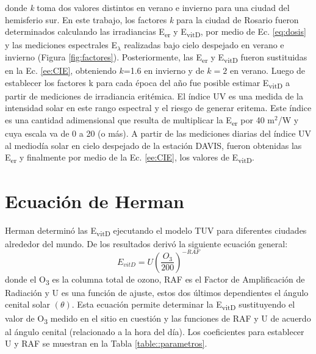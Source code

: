 \documentclass[10pt,twocolumn]{article}
\begin{document}
donde \emph{k} toma dos valores distintos en verano e invierno para una ciudad del hemisferio sur. En este trabajo, los factores \emph{k} para la ciudad de Rosario fueron determinados calculando las irradiancias E\textsubscript{er} y E\textsubscript{vitD}, por medio de Ec. \ref{eq:dosis} y las mediciones espectrales E$_\lambda$ realizadas bajo cielo despejado en verano e invierno (Figura \ref{fig:factores}). Posteriormente, las E\textsubscript{er} y E\textsubscript{vitD} fueron sustituidas en la Ec. \ref{ee:CIE}, obteniendo $k$=1.6 en invierno y de $k=2$ en verano. Luego de establecer los factores k para cada época del año fue posible estimar E\textsubscript{vitD} a partir de mediciones de irradiancia eritémica. El índice UV es una medida de la intensidad solar en este rango espectral y el riesgo de generar eritema. Este índice es una cantidad adimensional que resulta de multiplicar la E\textsubscript{er} por 40 m$^2$/W y cuya escala va de 0 a 20 (o más). A partir de las mediciones diarias del índice UV al mediodía solar en cielo despejado de la estación DAVIS, fueron obtenidas las E\textsubscript{er} y finalmente por medio de la Ec. \ref{ee:CIE}, los valores de E\textsubscript{vitD}.

\section{Ecuación de Herman}
Herman\cite{Herman2010} determinó las E\textsubscript{vitD} ejecutando el modelo TUV para diferentes ciudades alrededor del mundo. De los resultados derivó la siguiente ecuación general:
\begin{equation}
  E_{vitD}=U\left(\frac{O_3}{200}\right)^{-RAF}
  \label{eq:evitd}
\end{equation}
donde el O\textsubscript{3} es la columna total de ozono, RAF es el Factor de Amplificación de Radiación y U es una función de ajuste, estos dos últimos dependientes el ángulo cenital solar $(\theta)$. Esta ecuación permite determinar la E\textsubscript{vitD} sustituyendo el valor de O\textsubscript{3} medido en el sitio en cuestión y las funciones de RAF y U de acuerdo al ángulo cenital (relacionado a la hora del día). Los coeficientes para establecer U y RAF se muestran en la Tabla \ref{table::parametros}.
\end{document}
